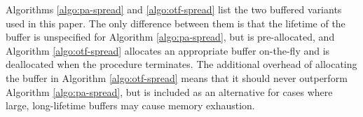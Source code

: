 Algorithms \ref{algo:pa-spread} and \ref{algo:otf-spread} list the two buffered
variants used in this paper. The only difference between them is that the
lifetime of the buffer is unspecified for Algorithm \ref{algo:pa-spread}, but
is pre-allocated, and Algorithm \ref{algo:otf-spread} allocates an appropriate
buffer on-the-fly and is deallocated when the procedure terminates. The
additional overhead of allocating the buffer in Algorithm \ref{algo:otf-spread}
means that it should never outperform Algorithm \ref{algo:pa-spread}, but is
included as an alternative for cases where large, long-lifetime buffers may
cause memory exhaustion.
